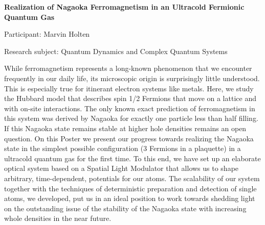\begin{minipage}[t]{1.0\textwidth}

\begin{center}

{{\large\bfseries Realization of Nagaoka Ferromagnetism in an Ultracold Fermionic Quantum Gas}\par}

\end{center}

{\noindent Participant: Marvin Holten\par} 

{\noindent Research subject: Quantum Dynamics and Complex Quantum Systems\par}\medskip

\noindent While ferromagnetism represents a long-known phenomenon that we encounter frequently in our daily life, its microscopic origin is surprisingly little understood. This is especially true for itinerant electron systems like metals. Here, we study the Hubbard model that describes spin 1/2 Fermions that move on a lattice and with on-site interactions. The only known exact prediction of ferromagnetism in this system was derived by Nagaoka for exactly one particle less than half filling. If this Nagaoka state remains stable at higher hole densities remains an open question.
On this Poster we present our progress towards realizing the Nagaoka state in the simplest possible configuration (3 Fermions in a plaquette) in a ultracold quantum gas for the first time. To this end, we have set up an elaborate optical system based on a Spatial Light Modulator that allows us to shape arbitrary, time-dependent, potentials for our atoms. The scalability of our system together with the techniques of deterministic preparation and detection of single atoms, we developed, put us in an ideal position to work towards shedding light on the outstanding issue of the stability of the Nagaoka state with increasing whole densities in the near future.\par\end{minipage}

\hfill 

